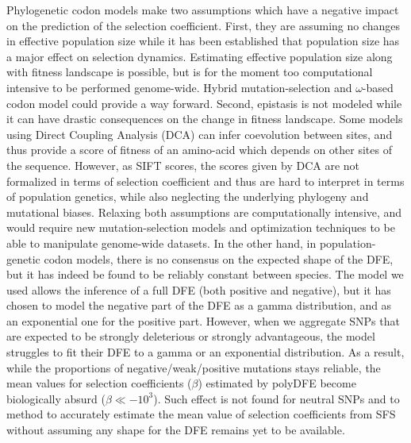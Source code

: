 \documentclass{article}
\newcommand{\Spop}{\beta}
\begin{document}
    Phylogenetic codon models make two assumptions which have a negative impact on the prediction of the selection coefficient.
    First, they are assuming no changes in effective population size while it has been established that population size has a major effect on selection dynamics\cite{lanfear_population_2014, platt_protein_2018}.
    Estimating effective population size along with fitness landscape is possible\cite{latrille_inferring_2021}, but is for the moment too computational intensive to be performed genome-wide\cite{latrille_inferring_2021}.
    Hybrid mutation-selection and $\omega$-based codon model could provide a way forward\cite{brevet_reconstructing_2021}.
    Second, epistasis is not modeled while it can have drastic consequences on the change in fitness landscape\cite{latrille_quantifying_2021}.
    Some models using Direct Coupling Analysis (DCA) can infer coevolution between sites, and thus provide a score of fitness of an amino-acid which depends on other sites of the sequence\cite{bisardi_modeling_2022}.
    However, as SIFT scores, the scores given by DCA are not formalized in terms of selection coefficient and thus are hard to interpret in terms of population genetics, while also neglecting the underlying phylogeny and mutational biases.
    Relaxing both assumptions are computationally intensive\cite{rodrigue_site_2005, kleinman_statistical_2010,latrille_inferring_2021}, and would require new mutation-selection models and optimization techniques to be able to manipulate genome-wide datasets.
    In the other hand, in population-genetic codon models, there is no consensus on the expected shape of the DFE\cite{welch_divergence_2008, bataillon_effects_2014}, but it has indeed be found to be reliably constant between species\cite{castellano_comparison_2019}.
    The model we used allows the inference of a full DFE (both positive and negative), but it has chosen to model the negative part of the DFE as a gamma distribution, and as an exponential one for the positive part.
    However, when we aggregate SNPs that are expected to be strongly deleterious or strongly advantageous, the model struggles to fit their DFE to a gamma or an exponential distribution.
    As a result, while the proportions of negative/weak/positive mutations stays reliable, the mean values for selection coefficients ($\Spop$) estimated by polyDFE become biologically absurd ($\Spop \ll -10^3$).
    Such effect is not found for neutral SNPs and to method to accurately estimate the mean value of selection coefficients from SFS without assuming any shape for the DFE remains yet to be available.
\end{document}
